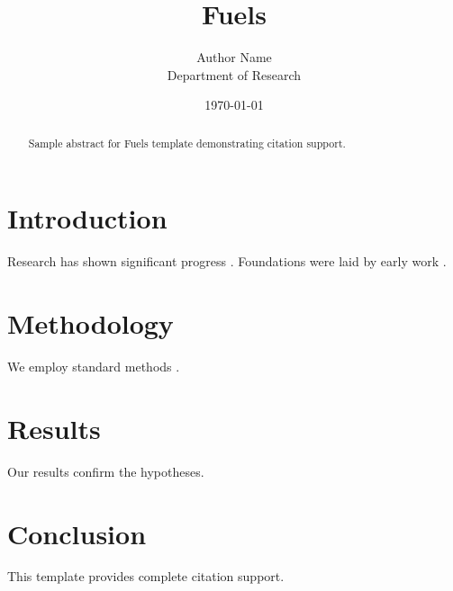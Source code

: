 \documentclass{mdpi}
\title{Fuels}
\author{Author Name \\ \small Department of Research}
\date{\today}
\begin{document}
\maketitle

\begin{abstract}
Sample abstract for Fuels template demonstrating citation support.
\end{abstract}

\section{Introduction}
Research has shown significant progress \citep{einstein1905}. Foundations were laid by early work \citep{turing1950}.

\section{Methodology}
We employ standard methods \citep{knuth1984}.

\section{Results}
Our results confirm the hypotheses.

\section{Conclusion}
This template provides complete citation support.



\end{document}
